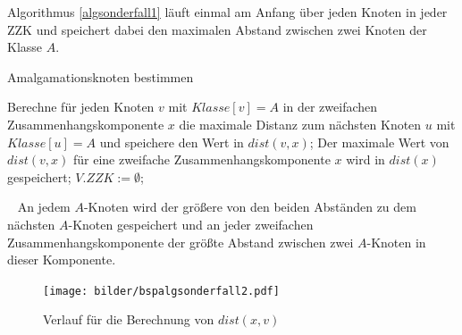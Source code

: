 Algorithmus \ref{algsonderfall1} läuft einmal am Anfang über jeden Knoten in jeder ZZK und speichert dabei den maximalen Abstand zwischen zwei Knoten der Klasse $A$.\\
\vspace{-5mm}
\begin{algorithm}
\caption{Amalgamationsknoten bestimmen}
\begin{algorithmic}[1]
\vspace{2mm}
\STATE Berechne für jeden Knoten $v$ mit $Klasse[v]=A$ in der zweifachen Zusammenhangskomponente $x$ die maximale Distanz zum nächsten Knoten $u$ mit $Klasse[u]=A$ und speichere den Wert in $dist(v,x)$;
\STATE Der maximale Wert von $dist(v,x)$ für eine zweifache Zusammenhangskomponente $x$ wird in $dist(x)$ gespeichert;
\STATE $V.ZZK:= \emptyset$;
\ENDFOR
\vspace{2mm}
\end{algorithmic}
\label{algsonderfall1}
\end{algorithm}
\vspace{-4mm}
~\linebreak
An jedem $A$-Knoten wird der größere von den beiden Abständen zu dem nächsten $A$-Knoten gespeichert und an jeder zweifachen Zusammenhangskomponente der größte Abstand zwischen zwei $A$-Knoten in dieser Komponente.\\
\vspace{-2mm}
\begin{figure}[h!]
\centering
\texttt{[image: bilder/bspalgsonderfall2.pdf]}
\caption{Verlauf für die Berechnung von $dist(x,v)$}
\label{bild:distberechnung}
\end{figure}
